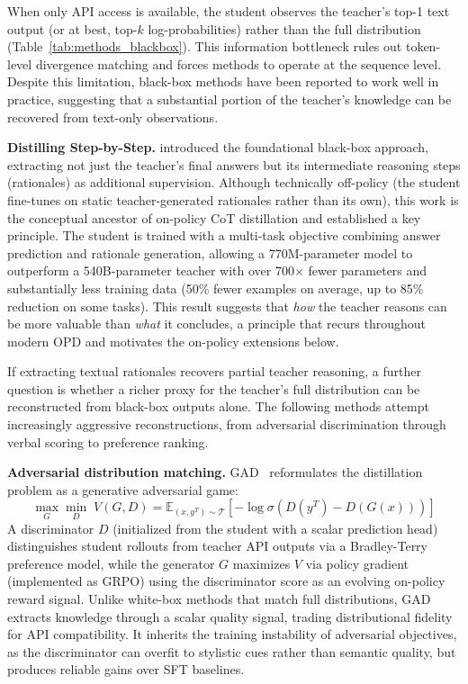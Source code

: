 \documentclass{article} %
\newcommand{\E}{\mathbb{E}}
\begin{document}
When only API access is available, the student observes the teacher's top-1 text output (or at best, top-$k$ log-probabilities) rather than the full distribution (Table~\ref{tab:methods_blackbox}). This information bottleneck rules out token-level divergence matching and forces methods to operate at the sequence level. Despite this limitation, black-box methods have been reported to work well in practice, suggesting that a substantial portion of the teacher's knowledge can be recovered from text-only observations.

\textbf{Distilling Step-by-Step.} \citet{2305.02301} introduced the foundational black-box approach, extracting not just the teacher's final answers but its intermediate reasoning steps (rationales) as additional supervision. Although technically off-policy (the student fine-tunes on static teacher-generated rationales rather than its own), this work is the conceptual ancestor of on-policy CoT distillation and established a key principle. The student is trained with a multi-task objective combining answer prediction and rationale generation, allowing a 770M-parameter model to outperform a 540B-parameter teacher with over 700$\times$ fewer parameters and substantially less training data (50\% fewer examples on average, up to 85\% reduction on some tasks). This result suggests that \emph{how} the teacher reasons can be more valuable than \emph{what} it concludes, a principle that recurs throughout modern OPD and motivates the on-policy extensions below.

If extracting textual rationales recovers partial teacher reasoning, a further question is whether a richer proxy for the teacher's full distribution can be reconstructed from black-box outputs alone. The following methods attempt increasingly aggressive reconstructions, from adversarial discrimination through verbal scoring to preference ranking.

\textbf{Adversarial distribution matching.} GAD~\citep{2511.10643} reformulates the distillation problem as a generative adversarial game:
\begin{equation}
    \max_{G} \min_{D}\; V(G, D) = \E_{(x, y^T) \sim \mathcal{T}} \left[ -\log \sigma\!\left( D(y^T) - D(G(x)) \right) \right]
\end{equation}
A discriminator $D$ (initialized from the student with a scalar prediction head) distinguishes student rollouts from teacher API outputs via a Bradley-Terry preference model, while the generator $G$ maximizes $V$ via policy gradient (implemented as GRPO) using the discriminator score as an evolving on-policy reward signal. Unlike white-box methods that match full distributions, GAD extracts knowledge through a scalar quality signal, trading distributional fidelity for API compatibility. It inherits the training instability of adversarial objectives, as the discriminator can overfit to stylistic cues rather than semantic quality, but produces reliable gains over SFT baselines.
\end{document}
